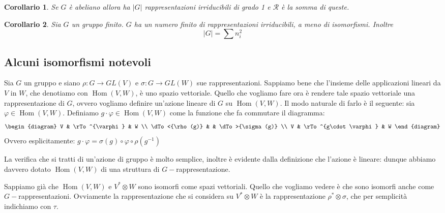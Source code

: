 \documentclass[11pt]{article}
\theoremstyle{plain}
\newtheorem*{cor}{Corollario}
\theoremstyle{definition}
\theoremstyle{remark}
\newcommand{\dsum}{\displaystyle\sum}
\DeclareMathOperator{\Hom}{Hom}
\newcommand{\quaddiag}[8]{
	\begin{diagram}
	#1     & \rTo^{#2} & #3 \\
	\dTo<{#6} &         & \dTo>{#4} \\
	#7     & \rTo^{#8} & #5
	\end{diagram}
}
\begin{document}
\begin{cor}
Se $G$ è abeliano allora ha $|G|$ rappresentazioni irriducibili di grado 1 e $\mathcal{R}$ è la somma di queste.
\end{cor}


\begin{cor}
Sia $G$ un gruppo finito. $G$ ha un numero finito di rappresentazioni irriducibili, a meno di isomorfismi. Inoltre
\[|G| = \dsum n_i^2\]
\end{cor}






\newpage
\subsection{Alcuni isomorfismi notevoli}
Sia $G$ un gruppo e siano $\rho:G\to GL(V)$ e $\sigma:G\to GL(W)$ sue rappresentazioni.
Sappiamo bene che l'insieme delle applicazioni lineari da $V$ in $W$,
che denotiamo con $\Hom(V, W)$, è uno spazio vettoriale.
Quello che vogliamo fare ora è rendere tale spazio vettoriale una rappresentazione di $G$,
ovvero vogliamo definire un'azione lineare di $G$ su $\Hom(V, W)$.
Il modo naturale di farlo è il seguente:
sia $\varphi\in\Hom(V, W)$. Definiamo $g\cdot \varphi\in\Hom(V, W)$ come la funzione che fa commutare il diagramma:
\[ \quaddiag V \varphi W {\sigma(g)} W {\rho(g)} V {g\cdot \varphi} \]
Ovvero esplicitamente: $g\cdot\varphi = \sigma(g) \circ \varphi\circ \rho(g^{-1})$

La verifica che si tratti di un'azione di gruppo è molto semplice, inoltre è evidente dalla definizione che l'azione è lineare:
dunque abbiamo davvero dotato $\Hom(V, W)$ di una struttura di $G-$rappresentazione.

Sappiamo già che $\Hom(V, W)$ e $V^*\otimes W$ sono isomorfi come spazi vettoriali.
Quello che vogliamo vedere è che sono isomorfi anche come $G-$rappresentazioni.
Ovviamente la rappresentazione che si considera su $V^*\otimes W$ è la rappresentazione $\rho^*\otimes\sigma$, che per semplicità indichiamo con $\tau$.
\end{document}
